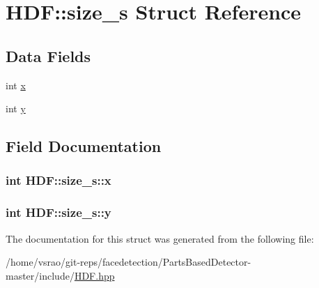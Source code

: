 \hypertarget{structHDF_1_1size__s}{\section{H\-D\-F\-:\-:size\-\_\-s Struct Reference}
\label{structHDF_1_1size__s}
}
\subsection*{Data Fields}
\begin{DoxyCompactItemize}
\item 
int \hyperlink{structHDF_1_1size__s_a409eafbca9a18aa873cd58c5694de025}{x}
\item 
int \hyperlink{structHDF_1_1size__s_aaf73b7c42bedbd634b3ae567eb4fad2a}{y}
\end{DoxyCompactItemize}


\subsection{Field Documentation}
\hypertarget{structHDF_1_1size__s_a409eafbca9a18aa873cd58c5694de025}{
\subsubsection[{x}]{\setlength{\rightskip}{0pt plus 5cm}int H\-D\-F\-::size\-\_\-s\-::x}}\label{structHDF_1_1size__s_a409eafbca9a18aa873cd58c5694de025}
\hypertarget{structHDF_1_1size__s_aaf73b7c42bedbd634b3ae567eb4fad2a}{
\subsubsection[{y}]{\setlength{\rightskip}{0pt plus 5cm}int H\-D\-F\-::size\-\_\-s\-::y}}\label{structHDF_1_1size__s_aaf73b7c42bedbd634b3ae567eb4fad2a}


The documentation for this struct was generated from the following file\-:\begin{DoxyCompactItemize}
\item 
/home/vsrao/git-\/reps/facedetection/\-Parts\-Based\-Detector-\/master/include/\hyperlink{HDF_8hpp}{H\-D\-F.\-hpp}\end{DoxyCompactItemize}
